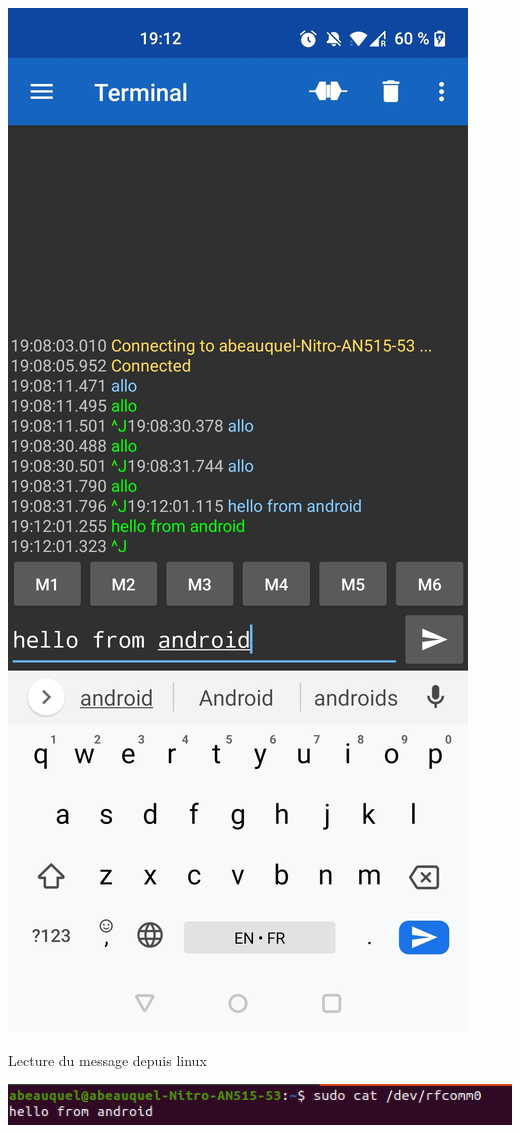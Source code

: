 \documentclass[12pt,fleqn]{article}
\begin{document}
\includegraphics[scale=0.1]{images/rfcomm_telephone_message.jpg}

Lecture du message depuis linux

\includegraphics[scale=0.7]{images/rfcomm_linux_message.png}
\end{document}
